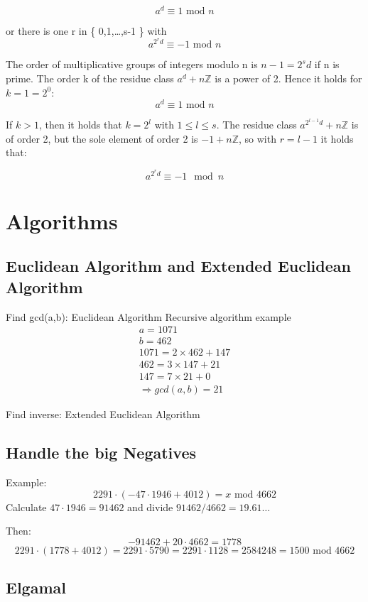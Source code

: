 \documentclass[a4paper]{article}
\begin{document}
\[ a^d \equiv 1 \text{ mod } n \]

or there is one r in \{ 0,1,\dots,s-1 \} with
\[ a^{2^r d} \equiv -1 \text{ mod } n \]

The order of multiplicative groups of integers modulo n is $n-1=2^sd$ if n is prime. The order k of the residue class $a^d + n\mathbb{Z}$ is a power of 2. Hence it holds for $k = 1 = 2^0$:
\[ a^d \equiv 1 \text{ mod } n \]

If $k>1$, then it holds that $k=2^l$ with $1 \leq l \leq s$. The residue class $a^{2^{l-1}d} + n\mathbb{Z}$ is of order 2, but the sole element of order 2 is $-1 + n\mathbb{Z}$, so with $r=l-1$ it holds that:

\[ a^{2^rd} \equiv -1 \mod n \]


\section{Algorithms}
\subsection{Euclidean Algorithm and Extended Euclidean Algorithm}
Find gcd(a,b): Euclidean Algorithm
Recursive algorithm example 
\begin{equation}
    \begin{split}
	a = 1071 \\
	b = 462 \\
	1071 = 2 \times 462 +  147 \\
	462 = 3 \times  147 + 21 \\
	147 = 7 \times 21 + 0 \\ 
	\Rightarrow gcd(a,b) = 21
    \end{split}
        \label{euclidean_example}
\end{equation}

Find inverse: Extended Euclidean Algorithm
\subsection{Handle the big Negatives}
Example:
\[ 2291 \cdot (-47 \cdot 1946 + 4012) = x \text{ mod } 4662\]
Calculate $47 \cdot 1946 = 91462$ and divide $91462/4662 = 19.61\dots$

Then:
\[ -91462 + 20 \cdot 4662 = 1778 \]
\[2291 \cdot (1778 + 4012) = 2291 \cdot 5790 = 2291 \cdot 1128 = 2584248 = 1500 \text{ mod } 4662\]
\subsection{Elgamal}
\end{document}
